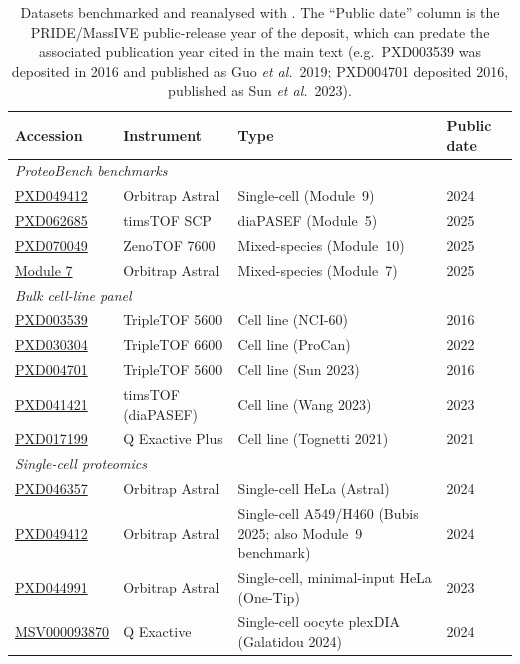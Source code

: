 \documentclass[preprint,12pt]{elsarticle}
\newcommand{\sdrf}[1]{\href{https://github.com/bigbio/sdrf-annotated-datasets/blob/main/datasets/#1/#1.sdrf.tsv}{#1}}
\begin{document}
\begin{table}[htbp]
\centering
\small
\caption{Datasets benchmarked and reanalysed with \quantmsdiann{}. The
``Public date'' column is the PRIDE/MassIVE public-release year of the
deposit, which can predate the associated publication year cited in the main
text (e.g.\ PXD003539 was deposited in 2016 and published as Guo \textit{et al.}~2019;
PXD004701 deposited 2016, published as Sun \textit{et al.}~2023).}
\label{tab:datasets-supp}
{\setlength{\tabcolsep}{4pt}
\begin{tabular}{ll>{\raggedright\arraybackslash}p{}l}
\hline
\textbf{Accession} & \textbf{Instrument} & \textbf{Type} & \textbf{Public date} \\
\hline
\multicolumn{4}{l}{\textit{ProteoBench benchmarks}} \\
\sdrf{PXD049412} & Orbitrap Astral & Single-cell (Module~9) & 2024 \\
\sdrf{PXD062685} & timsTOF SCP & diaPASEF (Module~5) & 2025 \\
\sdrf{PXD070049} & ZenoTOF 7600 & Mixed-species (Module~10) & 2025 \\
\href{https://github.com/bigbio/sdrf-annotated-datasets/blob/main/datasets/ProteoBench-Astral-Module7/ProteoBench-Astral-Module7.sdrf.tsv}{Module 7} & Orbitrap Astral & Mixed-species (Module~7) & 2025 \\
\hline
\multicolumn{4}{l}{\textit{Bulk cell-line panel}} \\
\sdrf{PXD003539} & TripleTOF 5600 & Cell line (NCI-60) & 2016 \\
\sdrf{PXD030304} & TripleTOF 6600 & Cell line (ProCan) & 2022 \\
\sdrf{PXD004701} & TripleTOF 5600 & Cell line (Sun 2023) & 2016 \\
\sdrf{PXD041421} & timsTOF (diaPASEF) & Cell line (Wang 2023) & 2023 \\
\sdrf{PXD017199} & Q Exactive Plus & Cell line (Tognetti 2021) & 2021 \\
\hline
\multicolumn{4}{l}{\textit{Single-cell proteomics}} \\
\sdrf{PXD046357} & Orbitrap Astral & Single-cell HeLa (Astral) & 2024 \\
\sdrf{PXD049412} & Orbitrap Astral & Single-cell A549/H460 (Bubis 2025; also Module~9 benchmark) & 2024 \\
\sdrf{PXD044991} & Orbitrap Astral & Single-cell, minimal-input HeLa (One-Tip) & 2023 \\
\sdrf{MSV000093870} & Q Exactive & Single-cell oocyte plexDIA (Galatidou 2024) & 2024 \\

\end{tabular}}
\end{table}
\end{document}
